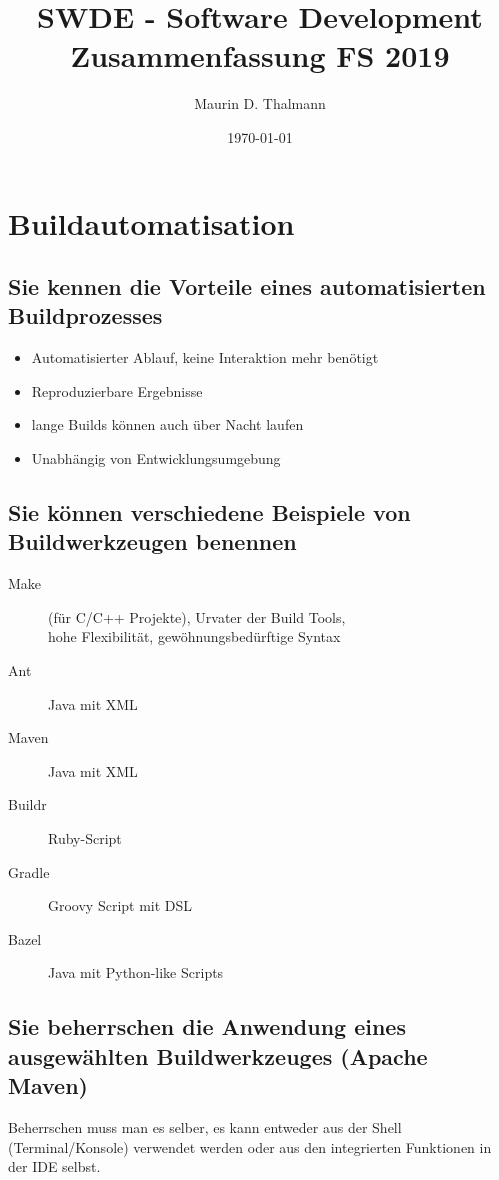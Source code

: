 \documentclass[a4paper]{article}
\title{\textbf{SWDE - Software Development\\
Zusammenfassung FS 2019}}
\date{\today}
\author{Maurin D. Thalmann}
\begin{document}
	\maketitle
	\newpage
	\tableofcontents
	\newpage
	
	\section{Buildautomatisation}
	
		\subsection{Sie kennen die Vorteile eines automatisierten Buildprozesses}
			\begin{itemize}
				\item Automatisierter Ablauf, keine Interaktion mehr benötigt
				\item Reproduzierbare Ergebnisse
				\item lange Builds können auch über Nacht laufen
				\item Unabhängig von Entwicklungsumgebung
			\end{itemize}
		
		\subsection{Sie können verschiedene Beispiele von Buildwerkzeugen benennen}
			\begin{description}
				\item[Make] (für C/C++ Projekte), Urvater der Build Tools, \\
				hohe Flexibilität, gewöhnungsbedürftige Syntax
				\item[Ant] Java mit XML
				\item[Maven] Java mit XML
				\item[Buildr] Ruby-Script
				\item[Gradle] Groovy Script mit DSL
				\item[Bazel] Java mit Python-like Scripts
			\end{description}
		
		\subsection{Sie beherrschen die Anwendung eines ausgewählten Buildwerkzeuges (Apache Maven)}
		Beherrschen muss man es selber, es kann entweder aus der Shell (Terminal/Konsole) verwendet werden oder aus den integrierten Funktionen in der IDE selbst.
		
\end{document}
